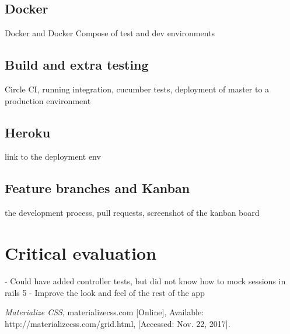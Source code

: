 \documentclass[a4paper, 11pt, titlepage]{article}
\begin{document}
\subsection{Docker}
Docker and Docker Compose of test and dev environments

\subsection{Build and extra testing}
Circle CI, running integration, cucumber tests, deployment of master to a production environment

\subsection{Heroku}
link to the deployment env

\subsection{Feature branches and Kanban}
the development process, pull requests, screenshot of the kanban board

\section{Critical evaluation}
- Could have added controller tests, but did not know how to mock sessions in rails 5
- Improve the look and feel of the rest of the app

\begin{thebibliography}{1}

 \emph{Materialize CSS}, materializecss.com [Online],
Available: http://materializecss.com/grid.html, [Accessed: Nov. 22, 2017].

\end{thebibliography}
\end{document}
